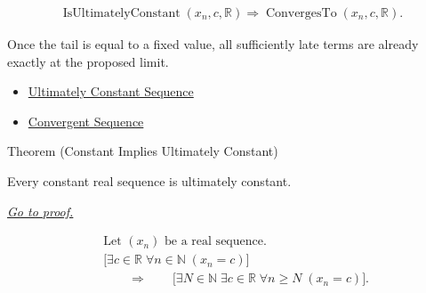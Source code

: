 \begin{remark*}
\[
\begin{aligned}
\operatorname{IsUltimatelyConstant}(x_n,c,\mathbb{R})
\Longrightarrow
\operatorname{ConvergesTo}(x_n,c,\mathbb{R}).
\end{aligned}
\]
\end{remark*}

\begin{remark*}[Interpretation]
Once the tail is equal to a fixed value, all sufficiently late terms are
already exactly at the proposed limit.
\end{remark*}

\begin{dependencies}
\begin{itemize}
  \item \hyperref[def:ultimately-constant-sequence]{Ultimately Constant Sequence}
  \item \hyperref[def:convergent-sequence]{Convergent Sequence}
\end{itemize}
\end{dependencies}


\begin{theorembox}{Theorem (Constant Implies Ultimately Constant)}
\begin{theorem}
\label{thm:constant-implies-ultimately-constant}
Every constant real sequence is ultimately constant.

\smallskip
\noindent
\hyperref[prf:constant-implies-ultimately-constant]{\textit{Go to proof.}}
\end{theorem}
\end{theorembox}

\begin{remark*}
\[
\begin{aligned}
&\text{Let } (x_n) \text{ be a real sequence.}\\
&\bigl[
\exists c \in \mathbb{R}\;
\forall n \in \mathbb{N}\;(x_n = c)
\bigr]\\
&\qquad\Longrightarrow\qquad
\bigl[
\exists N \in \mathbb{N}\;
\exists c \in \mathbb{R}\;
\forall n \ge N\;(x_n = c)
\bigr].
\end{aligned}
\]
\end{remark*}

